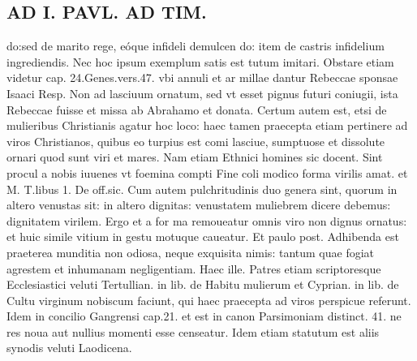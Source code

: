 \documentclass{article}
\begin{document}
\begin{pages}
\section*{AD I. PAVL. AD TIM. }
\marginpar{[ p.78 ]}\pstart do:sed de marito rege, eóque infideli demulcen do: item de castris infidelium ingrediendis. Nec hoc ipsum exemplum satis est tutum imitari. Obstare etiam videtur cap. 24.Genes.vers.47. vbi annuli et ar millae dantur Rebeccae sponsae Isaaci Resp. Non ad lasciuum ornatum, sed vt esset pignus futuri coniugii, ista Rebeccae fuisse et missa ab Abrahamo et donata. Certum autem est, etsi de mulieribus Christianis agatur hoc loco: haec tamen praecepta etiam pertinere ad viros Christianos, quibus eo turpius est comi lasciue, sumptuose et dissolute ornari quod sunt viri et mares. Nam etiam Ethnici homines sic docent. Sint procul a nobis iuuenes vt foemina compti Fine coli modico forma virilis amat. et M. T.libus 1. De off.sic. Cum autem pulchritudinis duo genera sint, quorum in altero venustas sit: in altero dignitas: venustatem muliebrem dicere debemus: dignitatem virilem. Ergo et a for ma remoueatur omnis viro non dignus ornatus: et huic simile vitium in gestu motuque caueatur. Et paulo post. Adhibenda est praeterea munditia non odiosa, neque exquisita nimis: tantum quae fogiat agrestem et inhumanam negligentiam. Haec ille. Patres etiam scriptoresque Ecclesiastici veluti Tertullian. in lib.  de Habitu mulierum et Cyprian. in lib.  de Cultu virginum nobiscum faciunt, qui haec praecepta ad viros perspicue referunt. Idem in concilio Gangrensi cap.21. et est in canon Parsimoniam distinct. 41. ne res noua aut nullius momenti esse censeatur. Idem etiam statutum est aliis synodis veluti Laodicena.  \pend

\end{pages}
\end{document}
